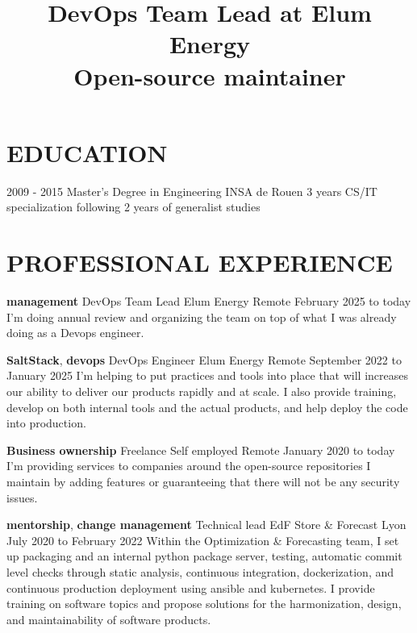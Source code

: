 \documentclass[11pt,a4paper]{moderncv}
\title{
  DevOps Team Lead at Elum Energy \texorpdfstring{ \\ }(
  Open-source maintainer
}
\begin{document}
  \maketitle
  \vspace*{-5mm}

  \section{EDUCATION}\label{sec:education}
  \cventry
    {2009 - 2015}
    {Master's Degree in Engineering}
    {INSA de Rouen}
    {3 years CS/IT specialization following 2 years of generalist studies}
	{}{}



  \section{PROFESSIONAL EXPERIENCE}
  \label{sec:professional-experience}

  \cventry
    { \textbf{management}}
    {DevOps Team Lead}
    {Elum Energy}
    {Remote}
    {February 2025 to today}{
      I'm doing annual review and organizing the team on top of what I was
      already doing as a Devops engineer.
    }

    \cventry
    {\textbf{SaltStack}, \textbf{devops}}
    {DevOps Engineer}
    {Elum Energy}
    {Remote}
    {September 2022 to January 2025}{
      I'm helping to put practices and tools into place that will increases
      our ability to deliver our products rapidly and at scale. I also provide
      training, develop on both internal tools and the actual products, and help
      deploy the code into production.
    }

    \cventry
    {\textbf{Business ownership}}
    {Freelance}
    {Self employed}
    {Remote}
    {January 2020 to today}{
      I'm providing services to companies around the open-source repositories
      I maintain by adding features or guaranteeing that there will not be any
      security issues.
    }

  \cventry
    {\textbf{mentorship}, \textbf{change management}}
    {Technical lead}
    {EdF Store \& Forecast}
    {Lyon}
    {July 2020 to February 2022}{
      Within the Optimization \& Forecasting team, I set up packaging and an
      internal python package server, testing, automatic commit level checks
      through static analysis, continuous integration, dockerization, and
      continuous production deployment using ansible and kubernetes. I provide
      training on software topics and propose solutions for the harmonization,
      design, and maintainability of software products.
    }
\end{document}
